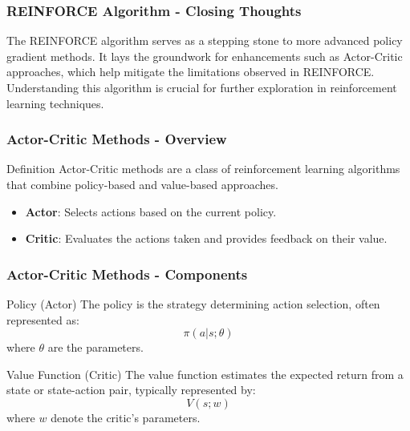\documentclass[aspectratio=169]{beamer}
\begin{document}
\begin{frame}[fragile]
    \frametitle{REINFORCE Algorithm - Closing Thoughts}
    The REINFORCE algorithm serves as a stepping stone to more advanced policy gradient methods. 
    It lays the groundwork for enhancements such as Actor-Critic approaches, which help mitigate 
    the limitations observed in REINFORCE. Understanding this algorithm is crucial for further 
    exploration in reinforcement learning techniques.
\end{frame}

\begin{frame}[fragile]
    \frametitle{Actor-Critic Methods - Overview}
    \begin{block}{Definition}
        Actor-Critic methods are a class of reinforcement learning algorithms that combine policy-based and value-based approaches.
    \end{block}
    \begin{itemize}
        \item \textbf{Actor}: Selects actions based on the current policy.
        \item \textbf{Critic}: Evaluates the actions taken and provides feedback on their value.
    \end{itemize}
\end{frame}

\begin{frame}[fragile]
    \frametitle{Actor-Critic Methods - Components}
    \begin{block}{Policy (Actor)}
        The policy is the strategy determining action selection, often represented as:
        \begin{equation}
        \pi(a|s; \theta)
        \end{equation}
        where \( \theta \) are the parameters.
    \end{block}
    
    \begin{block}{Value Function (Critic)}
        The value function estimates the expected return from a state or state-action pair, typically represented by:
        \begin{equation}
        V(s; w)
        \end{equation}
        where \( w \) denote the critic's parameters.
    \end{block}
\end{frame}
\end{document}
